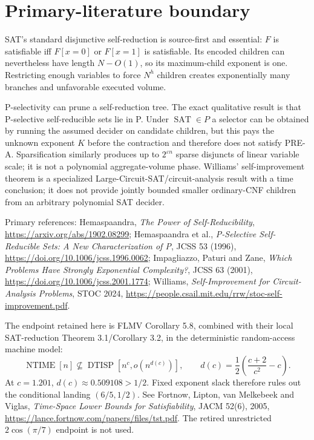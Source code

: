 \documentclass[11pt]{article}
\newcommand{\SAT}{\operatorname{SAT}}
\begin{document}
\section{Primary-literature boundary}

SAT's standard disjunctive self-reduction is source-first and essential:
$F$ is satisfiable iff $F[x=0]$ or $F[x=1]$ is satisfiable.  Its encoded
children can nevertheless have length $N-O(1)$, so its maximum-child
exponent is one.  Restricting enough variables to force $N^h$ children
creates exponentially many branches and unfavorable executed volume.

P-selectivity can prune a self-reduction tree.  The exact qualitative result
is that P-selective self-reducible sets lie in P.  Under $\SAT\in P$ a
selector can be obtained by running the assumed decider on candidate
children, but this pays the unknown exponent $K$ before the contraction and
therefore does not satisfy PRE-A.  Sparsification similarly produces up to
$2^{\varepsilon n}$ sparse disjuncts of linear variable scale; it is not a
polynomial aggregate-volume phase.  Williams' self-improvement theorem is a
specialized Large-Circuit-SAT/circuit-analysis result with a time conclusion;
it does not provide jointly bounded smaller ordinary-CNF children from an
arbitrary polynomial SAT decider.

Primary references: Hemaspaandra, \emph{The Power of Self-Reducibility},
\url{https://arxiv.org/abs/1902.08299}; Hemaspaandra et al.,
\emph{P-Selective Self-Reducible Sets: A New Characterization of P}, JCSS 53
(1996), \url{https://doi.org/10.1006/jcss.1996.0062}; Impagliazzo, Paturi and
Zane, \emph{Which Problems Have Strongly Exponential Complexity?}, JCSS 63
(2001), \url{https://doi.org/10.1006/jcss.2001.1774}; Williams,
\emph{Self-Improvement for Circuit-Analysis Problems}, STOC 2024,
\url{https://people.csail.mit.edu/rrw/stoc-self-improvement.pdf}.

The endpoint retained here is FLMV Corollary 5.8, combined with their local
SAT-reduction Theorem 3.1/Corollary 3.2, in the deterministic random-access
machine model:
\[
 \operatorname{NTIME}[n]\not\subseteq
 \operatorname{DTISP}\!\left[n^c,o\!\left(n^{d(c)}\right)\right],
 \qquad d(c)=\frac12\left(\frac{c+2}{c^2}-c\right). \tag{9}
\]
At $c=1.201$, $d(c)\approx0.509108>1/2$.  Fixed exponent slack therefore
rules out the conditional landing $(6/5,1/2)$.  See Fortnow, Lipton, van
Melkebeek and Viglas, \emph{Time-Space Lower Bounds for Satisfiability},
JACM 52(6), 2005, \url{https://lance.fortnow.com/papers/files/tst.pdf}.
The retired unrestricted $2\cos(\pi/7)$ endpoint is not used.
\end{document}

